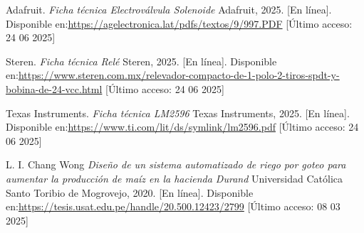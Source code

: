 \documentclass[pdflatex,sn-mathphys-num]{sn-jnl}%
\theoremstyle{thmstyleone}%
\theoremstyle{thmstyletwo}%
\theoremstyle{thmstylethree}%
\begin{document}
\begin{multicols}{2}
\begin{thebibliography}{4}
Adafruit.
\textit{Ficha técnica Electroválvula Solenoide}
Adafruit, 2025.
[En línea]. Disponible en:\url{https://agelectronica.lat/pdfs/textos/9/997.PDF}
[Último acceso: 24 06 2025] 

Steren.
\textit{Ficha técnica Relé}
Steren, 2025.
[En línea]. Disponible en:\href{https://www.steren.com.mx/relevador-compacto-de-1-polo-2-tiros-spdt-y-bobina-de-24-vcc.html}{https://www.steren.com.mx/relevador-compacto-de-1-polo-2-tiros-spdt-y- bobina-de-24-vcc.html}
[Último acceso: 24 06 2025] 

Texas Instruments.
\textit{Ficha técnica LM2596}
Texas Instruments, 2025.
[En línea]. Disponible en:\url{https://www.ti.com/lit/ds/symlink/lm2596.pdf}
[Último acceso: 24 06 2025] 

L. I. Chang Wong
\textit{Diseño de un sistema automatizado de riego por goteo para aumentar la producción de maíz en la hacienda Durand}
Universidad Católica Santo Toribio de Mogrovejo, 2020.
[En línea]. Disponible en:\url{https://tesis.usat.edu.pe/handle/20.500.12423/2799}
[Último acceso: 08 03 2025]

\end{thebibliography}
\end{multicols}
\end{document}
